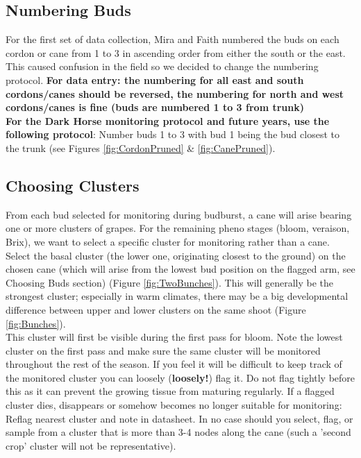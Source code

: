\documentclass[11pt,letter]{article}
\begin{document}
\subsection{Numbering Buds}
For the first set of data collection, Mira and Faith numbered the buds on each cordon or cane from 1 to 3 in ascending order from either the south or the east. This caused confusion in the field so we decided to change the numbering protocol. {\bf For data entry: the numbering for all east and south cordons/canes should be reversed, the numbering for north and west cordons/canes is fine (buds are numbered 1 to 3 from trunk)} \\

{\bf For the Dark Horse monitoring protocol and future years, use the following protocol}:
Number buds 1 to 3 with bud 1 being the bud closest to the trunk (see Figures \ref{fig:CordonPruned} \& \ref{fig:CanePruned}). 

\subsection{Choosing Clusters}
From each bud selected for monitoring during budburst, a cane will arise bearing one or more clusters of grapes. For the remaining pheno stages (bloom, veraison, Brix), we want to select a specific cluster for monitoring rather than a cane. Select the basal cluster (the lower one, originating closest to the ground) on the chosen cane (which will arise from the lowest bud position on the flagged arm, see Choosing Buds section) (Figure \ref{fig:TwoBunches}). This will generally be the strongest cluster; especially in warm climates, there may be a big developmental difference between upper and lower clusters on the same shoot (Figure \ref{fig:Bunches}). \\

This cluster will first be visible during the first pass for bloom. Note the lowest cluster on the first pass and make sure the same cluster will be monitored throughout the rest of the season. If you feel it will be difficult to keep track of the monitored cluster you can loosely ({\bf loosely!}) flag it. Do not flag tightly before this as it can prevent the growing tissue from maturing regularly. If a flagged cluster dies, disappears or somehow becomes no longer suitable for monitoring: Reflag nearest cluster and note in datasheet. In no case should you select, flag, or sample from a cluster that is more than 3-4 nodes along the cane (such a 'second crop' cluster will not be representative). \\
\end{document}
